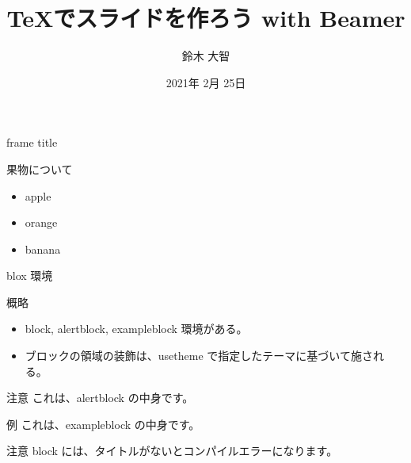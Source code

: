 \documentclass[dvipdfmx]{beamer}  %
\title[Beamer Tutorial]{\TeX でスライドを作ろう with Beamer}
\author[sudachi]{鈴木 大智}
\date[2021/02/25]{2021年 2月 25日}
\institute[日本大学大学院]{日本大学大学院 理工学研究科 数学専攻}
\begin{document}
\frame{\maketitle}

\begin{frame}{frame title}

  果物について
  
  \begin{itemize}
    \item apple
    \item orange
    \item banana
  \end{itemize}
\end{frame}

\begin{frame}{blox 環境}

  \begin{block}{概略}
    \begin{itemize}
      \item block, alertblock, exampleblock 環境がある。
      \item ブロックの領域の装飾は、usetheme で指定したテーマに基づいて施される。
    \end{itemize}
  \end{block}

  \begin{alertblock}{注意}
    これは、alertblock の中身です。
  \end{alertblock}

  \begin{exampleblock}{例}
    これは、exampleblock の中身です。
  \end{exampleblock}

  \begin{alertblock}{注意}
    block には、タイトルがないとコンパイルエラーになります。
  \end{alertblock}

\end{frame}
\end{document}
